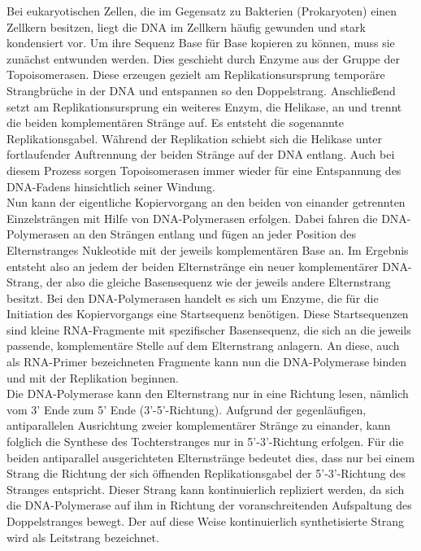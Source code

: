 Bei eukaryotischen Zellen, die im Gegensatz zu Bakterien (Prokaryoten) einen Zellkern besitzen, liegt die DNA im Zellkern häufig gewunden und stark kondensiert vor. Um ihre Sequenz Base für Base kopieren zu können, muss sie zunächst entwunden werden. Dies geschieht durch Enzyme aus der Gruppe der Topoisomerasen. Diese erzeugen gezielt am Replikationsursprung temporäre Strangbrüche in der DNA und entspannen so den Doppelstrang. Anschließend setzt am Replikationsursprung ein weiteres Enzym, die Helikase, an und trennt die beiden komplementären Stränge auf. Es entsteht die sogenannte Replikationsgabel. Während der Replikation schiebt sich die Helikase unter fortlaufender Auftrennung der beiden Stränge auf der DNA entlang. Auch bei diesem Prozess sorgen Topoisomerasen immer wieder für eine Entspannung des DNA-Fadens hinsichtlich seiner Windung. \\

Nun kann der eigentliche Kopiervorgang an den beiden von einander getrennten Einzelsträngen mit Hilfe von DNA-Polymerasen erfolgen. Dabei fahren die DNA-Polymerasen an den Strängen entlang und fügen an jeder Position des Elternstranges Nukleotide mit der jeweils komplementären Base an. Im Ergebnis entsteht also an jedem der beiden Elternstränge ein neuer komplementärer DNA-Strang, der also die gleiche Basensequenz wie der jeweils andere Elternstrang besitzt. Bei den DNA-Polymerasen handelt es sich um Enzyme, die für die Initiation des Kopiervorgangs eine Startsequenz benötigen. Diese Startsequenzen sind kleine RNA-Fragmente mit spezifischer Basensequenz, die sich an die jeweils passende, komplementäre Stelle auf dem Elternstrang anlagern. An diese, auch als RNA-Primer bezeichneten Fragmente kann nun die DNA-Polymerase binden und mit der Replikation beginnen. \\

Die DNA-Polymerase kann den Elternstrang nur in eine Richtung lesen, nämlich vom 3' Ende zum 5' Ende (3'-5'-Richtung). Aufgrund der gegenläufigen, antiparallelen Ausrichtung zweier komplementärer Stränge zu einander, kann folglich die Synthese des Tochterstranges nur in 5'-3'-Richtung erfolgen. Für die beiden antiparallel ausgerichteten Elternstränge bedeutet dies, dass nur bei einem Strang die Richtung der sich öffnenden Replikationsgabel der 5'-3'-Richtung des Stranges entspricht. Dieser Strang kann kontinuierlich repliziert werden, da sich die DNA-Polymerase auf ihm in Richtung der voranschreitenden Aufspaltung des Doppelstranges bewegt. Der auf diese Weise kontinuierlich synthetisierte Strang wird als Leitstrang bezeichnet. \\

